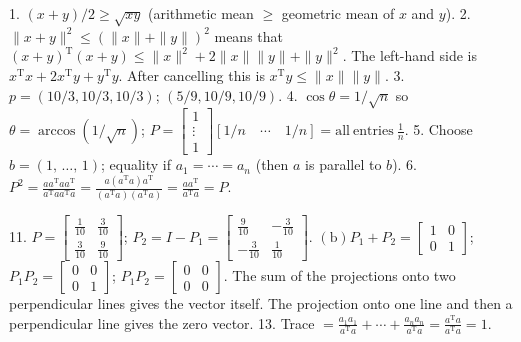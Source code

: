 1. \((x+y)/2\geq\sqrt{xy}\) (arithmetic mean \(\geq\) geometric mean of \(x\) and \(y\)). 2. \(\|x+y\|^{2}\leq(\|x\|+\|y\|)^{2}\) means that \((x+y)^{\mathrm{T}}(x+y)\leq\|x\|^{2}+2\|x\|\|y\|+\|y\|^{2}\). The left-hand side is \(x^{\mathrm{T}}x+2x^{\mathrm{T}}y+y^{\mathrm{T}}y\). After cancelling this is \(x^{\mathrm{T}}y\leq\|x\|\|y\|\).
3. \(p=(10/3,10/3,10/3)\); \((5/9,10/9,10/9)\).
4. \(\cos\theta=1/\sqrt{n}\) so \(\theta=\arccos(1/\sqrt{n})\); \(P=\left[\begin{matrix}1\\ \vdots\\ 1\end{matrix}\right][1/n\quad\cdots\quad 1/n]=\mathrm{all\ entries}\ \frac{1}{n}\).
5. Choose \(b=(1,\,\ldots,\,1)\); equality if \(a_{1}=\cdots=a_{n}\) (then \(a\) is parallel to \(b\)).
6. \(P^{2}=\frac{aa^{\mathrm{T}}aa^{\mathrm{T}}}{a^{\mathrm{T}}aa^{\mathrm{T}}a}= \frac{a(a^{\mathrm{T}}a)a^{\mathrm{T}}}{(a^{\mathrm{T}}a)(a^{\mathrm{T}}a)}= \frac{aa^{\mathrm{T}}}{a^{\mathrm{T}}a}=P\).

11. \(P=\left[\begin{matrix}\frac{1}{10}&\frac{3}{10}\\ \frac{3}{10}&\frac{9}{10}\end{matrix}\right]\); \(P_{2}=I-P_{1}=\left[\begin{matrix}\frac{9}{10}&-\frac{3}{10}\\ -\frac{3}{10}&\frac{1}{10}\end{matrix}\right]\). \((\mathrm{b})\)\(P_{1}+P_{2}=\left[\begin{matrix}1&0\\ 0&1\end{matrix}\right]\); \(P_{1}P_{2}=\left[\begin{matrix}0&0\\ 0&1\end{matrix}\right]\); \(P_{1}P_{2}=\left[\begin{matrix}0&0\\ 0&0\end{matrix}\right]\). The sum of the projections onto two perpendicular lines gives the vector itself. The projection onto one line and then a perpendicular line gives the zero vector.
13. Trace \(=\frac{a_{1}a_{1}}{a^{\mathrm{T}}a}+\cdots+\frac{a_{n}a_{n}}{a^{\mathrm{T}}a}= \frac{a^{\mathrm{T}}a}{a^{\mathrm{T}}a}=1\).

 